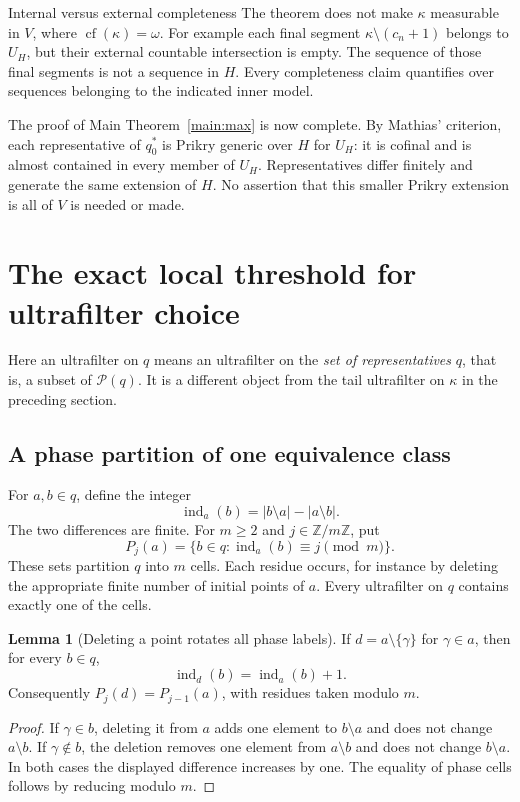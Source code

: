 \documentclass[11pt,letterpaper]{article}
\theoremstyle{definition}
\newtheorem{lemma}[definition]{Lemma}
\numberwithin{equation}{section}
\newcommand{\Pow}{\mathcal P}
\begin{document}
\begin{assessment}{Internal versus external completeness}
The theorem does not make $\kappa$ measurable in $V$, where $\operatorname{cf}(\kappa)=\omega$. For example each final segment $\kappa\setminus(c_n+1)$ belongs to $U_H$, but their external countable intersection is empty. The sequence of those final segments is not a sequence in $H$. Every completeness claim quantifies over sequences belonging to the indicated inner model.
\end{assessment}

The proof of Main Theorem~\ref{main:max} is now complete. By Mathias' criterion, each representative of $q_0^*$ is Prikry generic over $H$ for $U_H$: it is cofinal and is almost contained in every member of $U_H$. Representatives differ finitely and generate the same extension of $H$. No assertion that this smaller Prikry extension is all of $V$ is needed or made.

\section{The exact local threshold for ultrafilter choice}\label{sec:ultrafilters}

Here an ultrafilter on $q$ means an ultrafilter on the \emph{set of representatives} $q$, that is, a subset of $\Pow(q)$. It is a different object from the tail ultrafilter on $\kappa$ in the preceding section.

\subsection{A phase partition of one equivalence class}

For $a,b\in q$, define the integer
\[
 \operatorname{ind}_a(b)=|b\setminus a|-|a\setminus b|.
\]
The two differences are finite. For $m\ge2$ and $j\in\mathbb Z/m\mathbb Z$, put
\begin{equation}\label{eq:phase}
 P_j(a)=\{b\in q:\operatorname{ind}_a(b)\equiv j\pmod m\}.
\end{equation}
These sets partition $q$ into $m$ cells. Each residue occurs, for instance by deleting the appropriate finite number of initial points of $a$. Every ultrafilter on $q$ contains exactly one of the cells.

\begin{lemma}[Deleting a point rotates all phase labels]\label{lem:phase}
If $d=a\setminus\{\gamma\}$ for $\gamma\in a$, then for every $b\in q$,
\[
 \operatorname{ind}_d(b)=\operatorname{ind}_a(b)+1.
\]
Consequently $P_j(d)=P_{j-1}(a)$, with residues taken modulo $m$.
\end{lemma}
\begin{proof}
If $\gamma\in b$, deleting it from $a$ adds one element to $b\setminus a$ and does not change $a\setminus b$. If $\gamma\notin b$, the deletion removes one element from $a\setminus b$ and does not change $b\setminus a$. In both cases the displayed difference increases by one. The equality of phase cells follows by reducing modulo $m$.
\end{proof}
\end{document}

